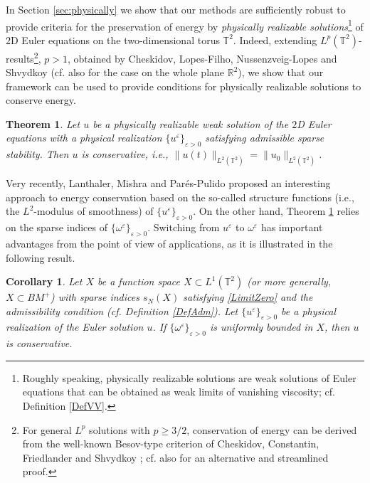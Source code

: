 \documentclass[11pt, a4paper,leqno]{amsart}
\newtheorem{theorem}{Theorem}
\theoremstyle{plain}
\newtheorem{corollary}{Corollary}
\numberwithin{equation}{section}
\theoremstyle{definition}
\theoremstyle{remark}
\def\R{\mathbb{R}}
\def\T{\mathbb{T}}
\begin{document}
In Section \ref{sec:physically} we show that our methods are sufficiently
robust to provide criteria for the preservation of energy by \emph{physically
realizable solutions}\footnote{Roughly speaking, physically realizable solutions are weak solutions of Euler equations that can be obtained as weak limits of vanishing viscosity; cf. Definition \ref{DefVV}.} of $2$D Euler equations  on the two-dimensional torus $\T^2$. Indeed, extending $L^p (\T^2)$-results\footnote{For general $L^p$ solutions with $p \geq 3/2$, conservation of energy can be derived from the well-known Besov-type criterion of Cheskidov, Constantin, Friedlander and Shvydkoy \cite{Ches2}; cf. also \cite[Theorem 1]{Ches} for an alternative and streamlined proof.}, $p > 1$, 
obtained by Cheskidov, Lopes-Filho, Nussenzveig-Lopes and Shvydkoy \cite{Ches} (cf. also \cite{Crippa} for the  case on the whole plane $\R^2$),  we show that our framework can be used
to provide conditions for physically realizable solutions  to
conserve energy. 

\begin{theorem}\label{ThmCon}
Let $u$ be a physically realizable weak solution of the $2$\emph{D} Euler equations with a physical realization $\{u^{\varepsilon}\}_{\varepsilon>0}$ satisfying admissible sparse stability. Then $u$ is conservative, i.e., $\|u(t)\|_{L^2(\mathbb{T}^2)} = \|u_0\|_{L^2(\mathbb{T}^2)}$. 
\end{theorem}

Very recently, Lanthaler, Mishra and Par\'es-Pulido \cite{Lan} proposed an interesting approach to energy conservation based on the so-called structure functions (i.e., the $L^2$-modulus of smoothness) of $\{u^\varepsilon\}_{\varepsilon > 0}$. On the other hand, Theorem \ref{ThmCon}    relies on the sparse indices of $\{\omega^\varepsilon\}_{\varepsilon > 0}$. Switching from $u^\varepsilon$ to $\omega^\varepsilon$ has important  advantages from the point of view of applications, as  it is illustrated in the following result. 

\begin{corollary}\label{CorCons}
		Let $X$ be a function space $X\subset L
^{1}(\mathbb{T}^{2})$ (or more generally, $X \subset BM^+$) with sparse indices $s_N(X)$ satisfying \eqref{LimitZero} and the admissibility condition (cf. Definition \ref{DefAdm}). Let $\{u^\varepsilon\}_{\varepsilon > 0}$ be a physical realization of the Euler solution $u$. If $\{\omega^\varepsilon\}_{\varepsilon > 0}$ is uniformly bounded in $X$, then $u$ is conservative. 
\end{corollary}
\end{document}

